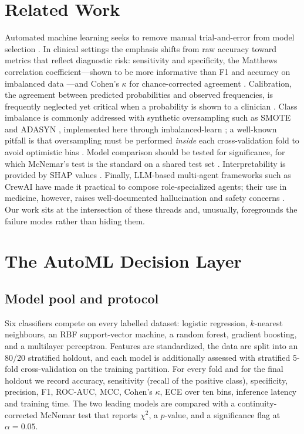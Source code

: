\documentclass[10pt,twocolumn]{article}
\begin{document}
\section{Related Work}
Automated machine learning seeks to remove manual trial-and-error from model
selection \cite{he2021automl}. In clinical settings the emphasis shifts from raw
accuracy toward metrics that reflect diagnostic risk: sensitivity and
specificity, the Matthews correlation coefficient---shown to be more
informative than F1 and accuracy on imbalanced data \cite{chicco2020mcc}---and
Cohen's $\kappa$ for chance-corrected agreement \cite{cohen1960kappa}.
Calibration, the agreement between predicted probabilities and observed
frequencies, is frequently neglected yet critical when a probability is shown to
a clinician \cite{guo2017calibration}. Class imbalance is commonly addressed
with synthetic oversampling such as SMOTE \cite{chawla2002smote} and ADASYN
\cite{he2008adasyn}, implemented here through imbalanced-learn
\cite{lemaitre2017imblearn}; a well-known pitfall is that oversampling must be
performed \emph{inside} each cross-validation fold to avoid optimistic bias
\cite{santos2018crossval}. Model comparison should be tested for significance,
for which McNemar's test is the standard on a shared test set
\cite{dietterich1998}. Interpretability is provided by SHAP values
\cite{lundberg2017shap}. Finally, LLM-based multi-agent frameworks such as
CrewAI have made it practical to compose role-specialized agents; their use in
medicine, however, raises well-documented hallucination and safety concerns
\cite{ji2023hallucination}. Our work sits at the intersection of these threads
and, unusually, foregrounds the failure modes rather than hiding them.

\section{The AutoML Decision Layer}
\subsection{Model pool and protocol}
Six classifiers compete on every labelled dataset: logistic regression,
$k$-nearest neighbours, an RBF support-vector machine, a random forest, gradient
boosting, and a multilayer perceptron. Features are standardized, the data are
split into an 80/20 stratified holdout, and each model is additionally assessed
with stratified 5-fold cross-validation on the training partition. For every
fold and for the final holdout we record accuracy, sensitivity (recall of the
positive class), specificity, precision, F1, ROC-AUC, MCC, Cohen's $\kappa$,
ECE over ten bins, inference latency and training time. The two leading models
are compared with a continuity-corrected McNemar test that reports
$\chi^2$, a $p$-value, and a significance flag at $\alpha=0.05$.
\end{document}
